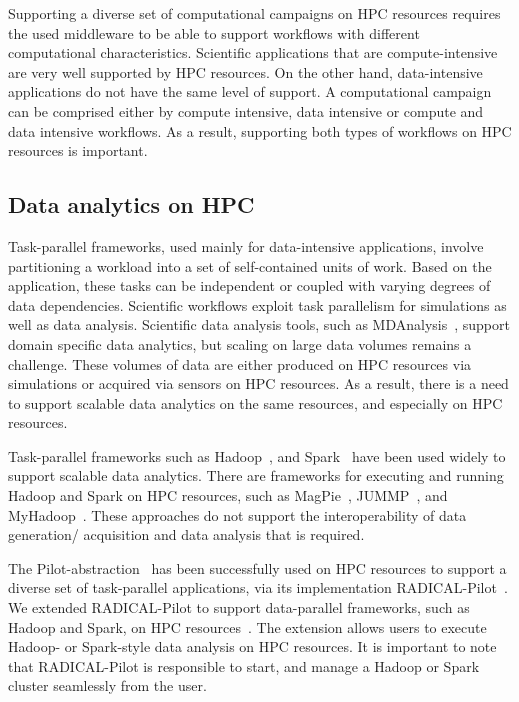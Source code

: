 \label{current_research}
Supporting a diverse set of computational campaigns on HPC resources requires the used middleware to be able to support workflows with different computational characteristics.
Scientific applications that are compute-intensive are very well supported by HPC resources.
On the other hand, data-intensive applications do not have the same level of support.
A computational campaign can be comprised either by compute intensive, data intensive or compute and data intensive workflows.
As a result, supporting both types of workflows on HPC resources is important.

\subsection{Data analytics on HPC}
\label{data_analysis_hpc}
Task-parallel frameworks, used mainly for data-intensive applications, involve partitioning a workload into a set of self-contained units of work. 
Based on the application, these tasks can be independent or coupled with varying degrees of data dependencies. 
Scientific workflows exploit task parallelism for simulations as well as data analysis.
Scientific data analysis tools, such as MDAnalysis~\cite{gowers2016mdanalysis,michaud2011mdanalysis}, support domain specific data analytics, but scaling on large data volumes remains a challenge.
These volumes of data are either produced on HPC resources via simulations or acquired via sensors on HPC resources.
As a result, there is a need to support scalable data analytics on the same resources, and especially on HPC resources.

Task-parallel frameworks such as Hadoop~\cite{hadoop}, and Spark~\cite{zaharia2010spark} have been used widely to support scalable data analytics.
There are frameworks for executing and running Hadoop and Spark on HPC resources, such as MagPie~\cite{magpie}, JUMMP~\cite{moody2013jummp}, and MyHadoop~\cite{krishnan04myhadoop}.
These approaches do not support the interoperability of data generation/ acquisition and data analysis that is required.

The Pilot-abstraction~\cite{luckow2012pstar} has been successfully used on HPC resources to support a diverse set of task-parallel applications, via its implementation RADICAL-Pilot~\cite{merzky2019using}.
We extended RADICAL-Pilot to support data-parallel frameworks, such as Hadoop and Spark, on HPC resources~\cite{luckow2016hadoop}.
The extension allows users to execute Hadoop- or Spark-style data analysis on HPC resources.
It is important to note that RADICAL-Pilot is responsible to start, and manage a Hadoop or Spark cluster seamlessly from the user.


